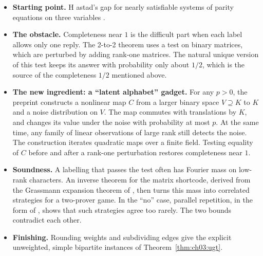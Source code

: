 \documentclass[handoutsbeamer.tex]{subfiles}
\begin{document}
\begin{frame}
\onp{\scriptsize}
\begin{itemize}\setlength\itemsep{0.25em}
    \item \textbf{Starting point.} H astad's gap for nearly satisfiable systems of parity equations on three variables \citep{Hstad2001}.
    \item \textbf{The obstacle.} Completeness near $1$ is the difficult part when each label allows only one reply. The 2-to-2 theorem \citep{Khot2018} uses a test on binary matrices, which are perturbed by adding rank-one matrices. The natural unique version of this test keeps its answer with probability only about $1/2$, which is the source of the completeness $1/2$ mentioned above.
    \item \textbf{The new ingredient: a ``latent alphabet'' gadget.} For any $p>0$, the preprint constructs a nonlinear map $C$ from a larger binary space $V \supseteq K$ to $K$ and a noise distribution on $V$. The map commutes with translations by $K$, and changes its value under the noise with probability at most $p$. At the same time, any family of linear observations of large rank still detects the noise. The construction iterates quadratic maps over a finite field. Testing equality of $C$ before and after a rank-one perturbation restores completeness near $1$.
    \item \textbf{Soundness.} A labelling that passes the test often has Fourier mass on low-rank characters. An inverse theorem for the matrix shortcode, derived from the Grassmann expansion theorem of \citet{Khot2018}, then turns this mass into correlated strategies for a two-prover game. In the ``no'' case, parallel repetition, in the form of \citet{dinur2014analytical}, shows that such strategies agree too rarely. The two bounds contradict each other.
    \item \textbf{Finishing.} Rounding weights and subdividing edges give the explicit unweighted, simple bipartite instances of Theorem~\ref{thm:ch03:ugt}.
\end{itemize}
\end{frame}
\end{document}
